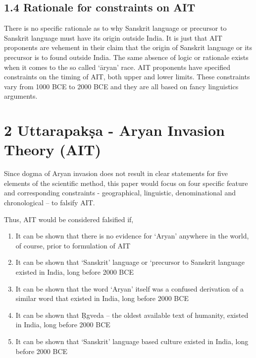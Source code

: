 \subsection*{1.4 Rationale for constraints on AIT}

There is no specific rationale as to why Sanskrit language or precursor to Sanskrit language must have its origin outside India. It is just that AIT proponents are vehement in their claim that the origin of Sanskrit language or its precursor is to found outside India. The same absence of logic or rationale exists when it comes to the so called ‘āryan’ race. AIT proponents have specified constraints on the timing of AIT, both upper and lower limits. These constraints vary from 1000 BCE to 2000 BCE and they are all based on fancy linguistics arguments.


\section*{2 Uttarapakṣa - Aryan Invasion Theory (AIT)}

Since dogma of Aryan invasion does not result in clear statements for five elements of the scientific method, this paper would focus on four specific feature and corresponding constraints - geographical, linguistic, denominational and chronological – to falsify AIT.

Thus, AIT would be considered falsified if,

\begin{enumerate}[{\rm 1)}]
\itemsep=0pt
\item It can be shown that there is no evidence for ‘Aryan’ anywhere in the world, of course, prior to formulation of AIT

 \item It can be shown that ‘Sanskrit’ language or ‘precursor to Sanskrit language existed in India, long before 2000 BCE

 \item It can be shown that the word ‘Aryan’ itself was a confused derivation of a similar word that existed in India, long before 2000 BCE

 \item It can be shown that Ṛgveda – the oldest available text of humanity, existed in India, long before 2000 BCE

 \item It can be shown that ‘Sanskrit’ language based culture existed in India, long before 2000 BCE

\end{enumerate}



